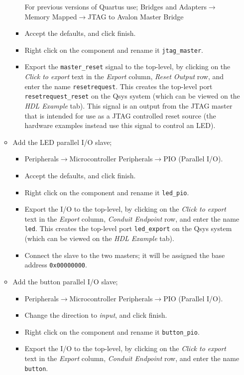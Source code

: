 \documentclass[10pt,twoside]{article}
\begin{document}
\begin{itemize}
\begin{itemize}
\begin{itemize}
For previous versions of Quartus use;\newline
Bridges and Adapters$\rightarrow$Memory Mapped$\rightarrow$JTAG to Avalon Master Bridge
\item Accept the defaults, and click finish.
\item Right click on the component and rename it \verb+jtag_master+.
\item Export the \verb+master_reset+ signal to the top-level, by clicking on the
{\em Click to export} text in the {\em Export} column,
{\em Reset Output} row, and enter the name \verb+resetrequest+.
This creates the top-level port \verb+resetrequest_reset+ on
the Qsys system (which can be viewed on the {\em HDL Example}
tab). This signal is an output from the JTAG master that is intended
for use as a JTAG controlled reset source (the hardware examples
instead use this signal to control an LED).
\end{itemize}
%
\item Add the LED parallel I/O slave;
\begin{itemize}
\item Peripherals$\rightarrow$Microcontroller Peripherals$\rightarrow$PIO
(Parallel I/O).
\item Accept the defaults, and click finish.
\item Right click on the component and rename it \verb+led_pio+.
\item Export the I/O to the top-level, by clicking on the
{\em Click to export} text in the {\em Export} column,
{\em Conduit Endpoint} row, and enter the name \verb+led+.
This creates the top-level port \verb+led_export+ on
the Qsys system (which can be viewed on the {\em HDL Example}
tab).
\item Connect the slave to the two masters; it will be assigned the base 
address \verb+0x00000000+.
\end{itemize}
%
\item Add the button parallel I/O slave;
\begin{itemize}
\item Peripherals$\rightarrow$Microcontroller Peripherals$\rightarrow$PIO
(Parallel I/O).
\item Change the direction to {\em input}, and click finish.
\item Right click on the component and rename it \verb+button_pio+.
\item Export the I/O to the top-level, by clicking on the
{\em Click to export} text in the {\em Export} column,
{\em Conduit Endpoint} row, and enter the name \verb+button+.

\end{itemize}
\end{itemize}
\end{itemize}
\end{document}
